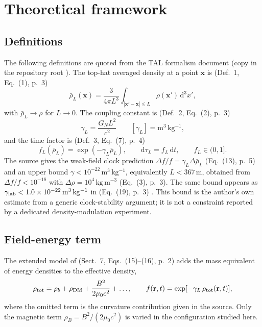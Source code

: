 \documentclass[12pt,a4paper]{article}
\newcommand{\dd}{\mathrm{d}}
\newcommand{\rhob}{\bar\rho_L}
\begin{document}
\section{Theoretical framework}\label{sec:theory}

\subsection{Definitions}
The following definitions are quoted from the TAL formalism document 
\cite{TAL_formalism} (copy in the repository root \cite{TAL_repo}). The top-hat averaged density at a
point $\mathbf x$ is (Def.~1, Eq.~(1), p.~3)
\begin{equation}
\rhob(\mathbf x)=\frac{3}{4\pi L^3}\int_{|\mathbf x'-\mathbf x|\le L}\rho(\mathbf x')\,\dd^3x' ,
\label{eq:tophat}
\end{equation}
with $\rhob\to\rho$ for $L\to0$. The coupling constant is (Def.~2, Eq.~(2), p.~3)
\begin{equation}
\gamma_L=\frac{G_N L^2}{c^2}\qquad[\gamma_L]=\mathrm{m^3\,kg^{-1}},
\label{eq:gamma}
\end{equation}
and the time factor is (Def.~3, Eq.~(7), p.~4)
\begin{equation}
f_L(\rhob)=\exp(-\gamma_L\rhob),\qquad \dd\tau_L=f_L\,\dd t,\qquad f_L\in(0,1].
\label{eq:fL}
\end{equation}
The source gives the weak-field clock prediction $\Delta f/f=\gamma_L\Delta\rhob$ (Eq.~(13), p.~5) and
an upper bound $\gamma<10^{-22}\,\mathrm{m^3\,kg^{-1}}$, equivalently $L<367$\,m, obtained from
$\Delta f/f<10^{-18}$ with $\Delta\rho=10^4\,\mathrm{kg\,m^{-3}}$ (Eq.~(3), p.~3). The same bound appears as
$\gamma_{\rm lab}<1.0\times10^{-22}\,\mathrm{m^3\,kg^{-1}}$ in  (Eq.~(19), p.~3)
\cite{TAL_publikacio}. This bound is the author's own estimate from a generic clock-stability
argument; it is not a constraint reported by a dedicated density-modulation experiment.

\subsection{Field-energy term}
The extended model of  (Sect.~7, Eqs.~(15)--(16), p.~2)
\cite{TAL_publikacio} adds the mass equivalent of energy densities to the effective density,
\begin{equation}
\rho_{\rm tot}=\rho_b+\rho_{\rm DM}+\frac{B^2}{2\mu_0c^2}+\dots,\qquad
f(\mathbf r,t)=\exp[-\gamma_L\,\rho_{\rm tot}(\mathbf r,t)],
\label{eq:rhotot}
\end{equation}
where the omitted term is the curvature contribution given in the source. Only the magnetic term
$\rho_B=B^2/(2\mu_0c^2)$ is varied in the configuration studied here.
\end{document}
